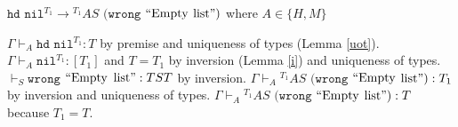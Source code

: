 \begin{case}
$\mathtt{hd}$ $\mathtt{nil}^{T_{1}}\rightarrow{^{T_{1}}A}S$ $(\mathtt{wrong}$ $\mathrm{``Empty}$ $\mathrm{list"})$ where $A\in\lbrace H,M\rbrace$

$\Gamma\vdash_{A}\mathtt{hd}$ $\mathtt{nil}^{T_{1}}:T$ by premise and uniqueness of types (Lemma \ref{uot}).  $\Gamma\vdash_{A}\mathtt{nil}^{T_{1}}:[T_{1}]$ and $T=T_{1}$ by inversion (Lemma \ref{i}) and uniqueness of types.  $\vdash_{S}\mathtt{wrong}$ $\mathrm{``Empty}$ $\mathrm{list"}:TST$ by inversion.  $\Gamma\vdash_{A}{^{T_{1}}A}S$ $(\mathtt{wrong}$ $\mathrm{``Empty}$ $\mathrm{list"}):T_{1}$ by inversion and uniqueness of types.  $\Gamma\vdash_{A}{^{T_{1}}A}S$ $(\mathtt{wrong}$ $\mathrm{``Empty}$ $\mathrm{list"}):T$ because $T_{1}=T$.
\end{case}